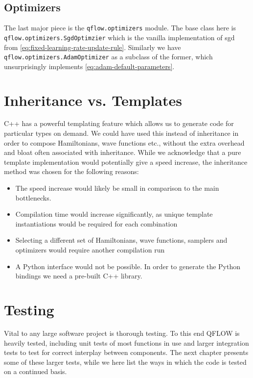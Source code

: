 \documentclass[Thesis.tex]{subfiles}
\begin{document}
\subsection{Optimizers}

The last major piece is the \texttt{qflow.optimizers} module. The base class
here is \texttt{qflow.\-optimizers.\-SgdOptimzier}
which is the vanilla implementation of \gls{sgd} from
\cref{eq:fixed-learning-rate-update-rule}. Similarly we have
\texttt{qflow.\-optimizers.\-AdamOptimizer} as a subclass of the former, which
unsurprisingly implements \cref{eq:adam-default-parameters}.


\section{Inheritance vs. Templates}

C++ has a powerful templating feature which allows us to generate code for
particular types on demand. We could have used this instead of inheritance in
order to compose Hamiltonians, wave functions etc., without the extra overhead
and bloat often associated with inheritance. While we acknowledge that a pure
template implementation would potentially give a speed increase, the inheritance
method was chosen for the following reasons:

\begin{itemize}
\item The speed increase would likely be small in comparison to the main
  bottlenecks.
\item Compilation time would increase significantly, as unique template
  instantiations would be required for each combination
\item Selecting a different set of Hamiltonians, wave functions, samplers and
  optimizers would require another compilation run
\item A Python interface would not be possible. In order to generate the
  Python bindings we need a pre-built C++ library.
\end{itemize}

\section{Testing}

Vital to any large software project is thorough testing. To this end QFLOW is
heavily tested, including unit tests of most functions in use and larger
integration tests to test for correct interplay between components. The next
chapter presents some of these larger tests, while we here list the ways in
which the code is tested on a continued basis.
\end{document}
